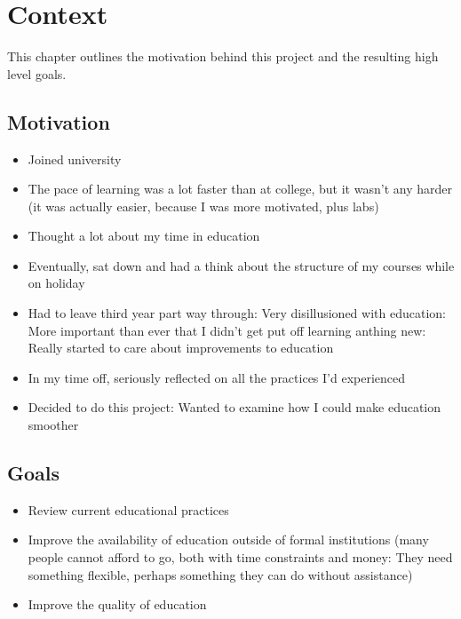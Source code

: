 \chapter{Context}
\label{chapter:context}
  This chapter outlines the motivation behind this project and the resulting high level goals.

  \section{Motivation}
    \begin{itemize}
      \item Joined university
      \item The pace of learning was a lot faster than at college, but it wasn't any harder (it was actually easier, because I was more motivated, plus labs)
      \item Thought a lot about my time in education
      \item Eventually, sat down and had a think about the structure of my courses while on holiday
      \item Had to leave third year part way through: Very disillusioned with education: More important than ever that I didn't get put off learning anthing new: Really started to care about improvements to education
      \item In my time off, seriously reflected on all the practices I'd experienced
      \item Decided to do this project: Wanted to examine how I could make education smoother
    \end{itemize}

  \section{Goals}
    \begin{itemize}
      \item Review current educational practices
      \item Improve the availability of education outside of formal institutions (many people cannot afford to go, both with time constraints and money: They need something flexible, perhaps something they can do without assistance)
      \item Improve the quality of education
    \end{itemize}

